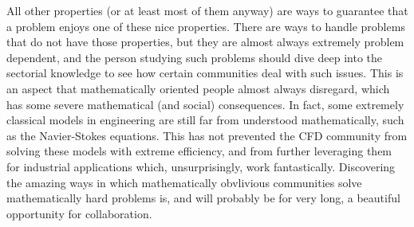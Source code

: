All other properties (or at least most of them anyway) are ways to guarantee that a problem enjoys one of these nice properties. There are ways to handle problems that do not have those properties, but they are almost always extremely problem dependent, and the person studying such problems should dive deep into the sectorial knowledge to see how certain communities deal with such issues. This is an aspect that mathematically oriented people almost always disregard, which has some severe mathematical (and social) consequences. In fact, some extremely classical models in engineering are still far from understood mathematically, such as the Navier-Stokes equations. This has not prevented the CFD community from solving these models with extreme efficiency, and from further leveraging them for industrial applications which, unsurprisingly, work fantastically. Discovering the amazing ways in which mathematically obvlivious communities solve mathematically hard problems is, and will probably be for very long, a beautiful opportunity for collaboration.


